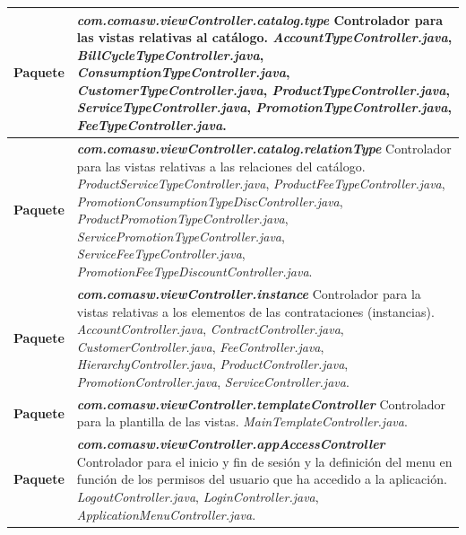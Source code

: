 \begin{longtable}{m{3cm} m{12cm}}
	\\\hline
\textbf{Paquete} & \textit{\textbf{com.comasw.viewController.catalog.type}} \newline
     Controlador para las vistas relativas al catálogo.\newline
\textit{AccountTypeController.java},
\textit{BillCycleTypeController.java},
\textit{ConsumptionTypeController.java},
\textit{CustomerTypeController.java},
\textit{ProductTypeController.java},
\textit{ServiceTypeController.java},
\textit{PromotionTypeController.java},
\textit{FeeTypeController.java}.
	\\\hline

	\textbf{Paquete} & \textit{\textbf{com.comasw.viewController.catalog.relationType}} \newline
     Controlador para las vistas relativas a las relaciones del catálogo.\newline
\textit{ProductServiceTypeController.java},
\textit{ProductFeeTypeController.java},
\textit{PromotionConsumptionTypeDiscController.java},
\textit{ProductPromotionTypeController.java},
\textit{ServicePromotionTypeController.java},
\textit{ServiceFeeTypeController.java},
\textit{PromotionFeeTypeDiscountController.java}.
	\\\hline


\textbf{Paquete} & \textit{\textbf{com.comasw.viewController.instance}} \newline
     Controlador para la vistas relativas a los elementos de las contrataciones (instancias).\newline
\textit{AccountController.java},
\textit{ContractController.java},
\textit{CustomerController.java},
\textit{FeeController.java},
\textit{HierarchyController.java},
\textit{ProductController.java},
\textit{PromotionController.java},
\textit{ServiceController.java}.
	\\\hline


	\textbf{Paquete} & \textit{\textbf{com.comasw.viewController.templateController}} \newline
     Controlador para la plantilla de las vistas.\newline
\textit{MainTemplateController.java}.
	\\\hline


\textbf{Paquete} & \textit{\textbf{com.comasw.viewController.appAccessController}} \newline
     Controlador para el inicio y fin de sesión y la definición del menu en función de los permisos del usuario que ha accedido a la aplicación.\newline
\textit{LogoutController.java},
\textit{LoginController.java},
\textit{ApplicationMenuController.java}.
	\\\hline



\end{longtable}
